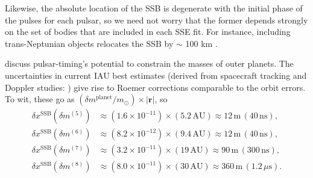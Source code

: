 \documentclass[iop,apj,twocolappendix]{emulateapj}
\begin{document}
Likewise, the absolute location of the SSB is degenerate with the initial phase of the pulses for each pulsar, so we need not worry that the former depends strongly on the set of bodies that are included in each SSE fit. For instance, including trans-Neptunian objects relocates the SSB by $\sim$ 100 km \citep{2014IPNPR.196C...1F}.

\citet{2010ApJ...720L.201C} discuss pulsar-timing's potential to constrain the masses of outer planets. The uncertainties in current IAU best estimates (derived from spacecraft tracking and Doppler studies: \citealt{iaumasses,jh+2000,2006AJ....132.2520J,2014AJ....148...76J,2009AJ....137.4322J}) give rise to Roemer corrections comparable to the orbit errors. To wit, these go as $(\delta m^\mathrm{planet}/m_\mathrm{\odot}) \times |\mathbf{r}|$, so
%
\begin{equation}
    \begin{aligned}
    \delta x^\mathrm{SSB}(\delta m^{(5)}) & \approx (1.6 \!\times\! 10^{-11})\!\times\!
    (5.2 \, \mathrm{AU})
    \approx 12 \, \mathrm{m} \, (40 \, \mathrm{ns}), \\
    \delta x^\mathrm{SSB}(\delta m^{(6)}) & \approx (8.2 \!\times\! 10^{-12}) \!\times\!
    (9.4 \, \mathrm{AU})
    \approx 12 \, \mathrm{m} \, (40 \, \mathrm{ns}), \\
    \delta x^\mathrm{SSB}(\delta m^{(7)}) & \approx (3.2 \!\times\! 10^{-11}) \!\times\!
    (19 \, \mathrm{AU})
    \approx 90 \, \mathrm{m} \, (300 \, \mathrm{ns}), \\
    \delta x^\mathrm{SSB}(\delta m^{(8)}) & \approx (8.0 \!\times\! 10^{-11}) \!\times\!
    (30 \, \mathrm{AU})
    \approx 360 \, \mathrm{m} \,
    (1.2 \, \mu\mathrm{s}).
    \end{aligned}
\end{equation}
\end{document}
